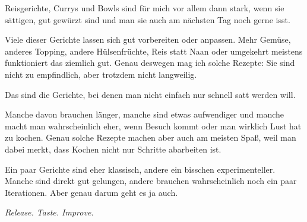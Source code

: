 \documentclass[
  a4paper,
  twoside,
  11pt
]{article}
\begin{document}


Reisgerichte, Currys und Bowls sind für mich vor allem dann stark, wenn sie sättigen, gut gewürzt sind und man sie auch am nächsten Tag noch gerne isst.

Viele dieser Gerichte lassen sich gut vorbereiten oder anpassen. Mehr Gemüse, anderes Topping, andere Hülsenfrüchte, Reis statt Naan oder umgekehrt \textendash{} meistens funktioniert das ziemlich gut. Genau deswegen mag ich solche Rezepte: Sie sind nicht zu empfindlich, aber trotzdem nicht langweilig.

\mylocaltableofcontents%
\newpage










Das sind die Gerichte, bei denen man nicht einfach nur schnell satt werden will.

Manche davon brauchen länger, manche sind etwas aufwendiger und manche macht man wahrscheinlich eher, wenn Besuch kommt oder man wirklich Lust hat zu kochen. Genau solche Rezepte machen aber auch am meisten Spaß, weil man dabei merkt, dass Kochen nicht nur Schritte abarbeiten ist.

Ein paar Gerichte sind eher klassisch, andere ein bisschen experimenteller. Manche sind direkt gut gelungen, andere brauchen wahrscheinlich noch ein paar Iterationen. Aber genau darum geht es ja auch.

\textit{Release. Taste. Improve.}

\mylocaltableofcontents%
\newpage








\end{document}
